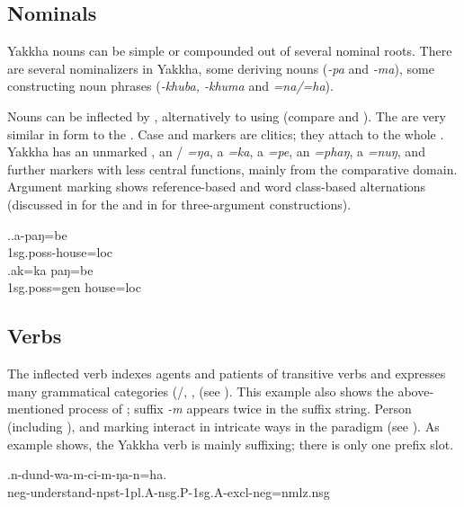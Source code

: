 \subsection{Nominals}

Yakkha nouns can be simple or compounded out of several nominal roots. There are several nominalizers in Yakkha, some deriving nouns (\emph{-pa} and \emph{-ma}), some constructing noun phrases (\emph{-khuba, -khuma} and \emph{=na/=ha}).

 Nouns can be inflected by , alternatively to using  (compare \Next[a] and \Next[b]). The  are very similar in form to the . Case and  markers are clitics; they attach to the whole . Yakkha has an unmarked , an / \emph{=ŋa}, a  \emph{=ka}, a  \emph{=pe}, an  \emph{=phaŋ}, a  \emph{=nuŋ}, and further markers with less central functions, mainly from the comparative domain. Argument marking shows reference-based and word class-based alternations (discussed in  for the   and in  for three-argument constructions).

\ex.\ag.a-paŋ=be\\ 
{\sc 1sg.poss-}house{\sc =loc}\\
\bg.ak=ka paŋ=be\\
{\sc 1sg.poss=gen} house{\sc =loc}\\


\subsection{Verbs}
\largerpage[-1]
The inflected verb  indexes agents and patients of transitive verbs and expresses many grammatical categories (/, ,  (see \Next). This example also shows the above-mentioned process of ; suffix \emph{-m} appears twice in the suffix string. Person (including ),  and  marking interact in intricate ways in the  paradigm (see ). As example \Next shows, the Yakkha verb is mainly suffixing; there is only one prefix slot. 

\exg.n-dund-wa-m-ci-m-ŋa-n=ha.\\
{\sc neg-}understand{\sc -npst-1pl.A-nsg.P-1sg.A-excl-neg=nmlz.nsg}\\


